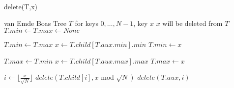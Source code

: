 \begin{algorithm}[H]
\caption{delete(T,x)}
\label{algorithm1}
\begin{algorithmic}
\REQUIRE van Emde Boas Tree $T$ for keys $0,\dots,N-1$, key $x$ 
\ENSURE $x$ will be deleted from $T$
	\STATE $T.min \leftarrow T.max \leftarrow None$
	\RETURN
\ENDIF

		\STATE $T.min \leftarrow T.max$
		\RETURN
	\ELSE
		\STATE $x \leftarrow T.child[T.aux.min].min$
		\STATE $T.min \leftarrow x$
	\ENDIF
\ENDIF

		\STATE $T.max \leftarrow T.min$
		\RETURN
	\ELSE
		\STATE $x \leftarrow T.child[T.aux.max].max$
		\STATE $T.max \leftarrow x$
	\ENDIF
\ENDIF

	\RETURN
\ENDIF

\STATE $i \leftarrow \lfloor \frac{x}{\sqrt{N}} \rfloor$
\STATE $delete(T.child[i], x \text{ mod } \sqrt{N})$
	\STATE $delete(T.aux, i)$
\ENDIF
\RETURN
\end{algorithmic}
\end{algorithm}


